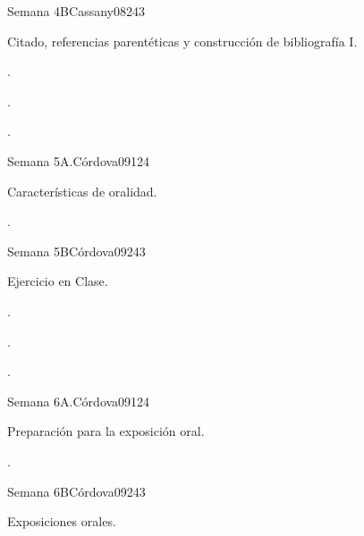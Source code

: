 \begin{syllabus}
\begin{unit}{}{Semana 4B}{Cassany08}{24}{3}
   \begin{topics}
      \item Citado, referencias parentéticas y construcción de bibliografía I.
   \end{topics}

   \begin{learningoutcomes}
      \item . 
      \item .
      \item . 
      \end{learningoutcomes}
\end{unit}

\begin{unit}{}{Semana 5A.}{Córdova09}{12}{4}
   \begin{topics}
      \item Características de oralidad.
   \end{topics}
   \begin{learningoutcomes}
      \item . 
   \end{learningoutcomes}
\end{unit}

\begin{unit}{}{Semana 5B}{Córdova09}{24}{3}
   \begin{topics}
      \item Ejercicio en Clase.
   \end{topics}

   \begin{learningoutcomes}
      \item . 
      \item .
      \item . 
      \end{learningoutcomes}
\end{unit}

\begin{unit}{}{Semana 6A.}{Córdova09}{12}{4}
   \begin{topics}
      \item Preparación para la exposición oral. 
   \end{topics}
   \begin{learningoutcomes}
      \item . 
   \end{learningoutcomes}
\end{unit}

\begin{unit}{}{Semana 6B}{Córdova09}{24}{3}
   \begin{topics}
      \item Exposiciones orales.
   \end{topics}


\end{unit}
\end{syllabus}
